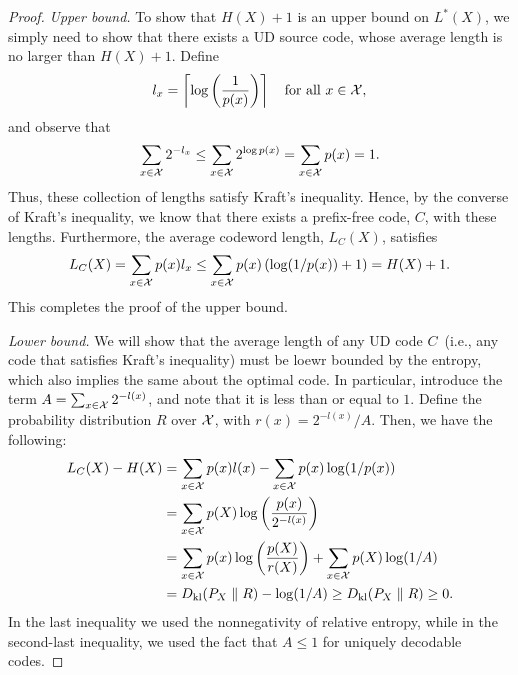     \begin{proof}
        \emph{Upper bound.} To show that $H(X) + 1$ is an upper bound on $L^*(X)$, we simply need to show that there exists a UD source code, whose average length is no larger than $H(X) + 1$. Define 
        \begin{align}
            l_x = \left\lceil \log\left( \frac{1}{p(x)} \right) \right\rceil \quad \text{for all } x \in \mathcal{X}, 
        \end{align}
        and observe that 
        \begin{align}
            \sum_{x \in \mathcal{X}} 2^{-l_x} \leq \sum_{x \in \mathcal{X}} 2^{\log p(x)} = \sum_{x \in \mathcal{X}} p(x) = 1. 
        \end{align}
        Thus, these collection of lengths satisfy Kraft's inequality. Hence, by the converse of Kraft's inequality, we know that there exists a prefix-free code, $C$, with these lengths. Furthermore, the average codeword length, $L_C(X)$, satisfies 
        \begin{align}
            L_C(X) = \sum_{x \in \mathcal{X}} p(x) l_x \leq \sum_{x \in \mathcal{X}} p(x)  \left( \log(1/p(x)) + 1 \right)  = H(X) + 1. 
        \end{align}
        This completes the proof of the upper bound. 
        

        \emph{Lower bound.} We will show that the average length of any UD code $C$~(i.e., any code that satisfies Kraft's inequality) must be loewr bounded by the entropy, which also implies the same about the optimal code. 
        In particular, introduce the term $A = \sum_{x \in \mathcal{X}} 2^{-l(x)}$, and note that it is less than or equal to $1$. Define the probability distribution $R$ over $\mathcal{X}$, with \pmf $r(x) = 2^{-l(x)}/A$. Then, we have the following: 
        \begin{align}
            L_C(X) - H(X) &= \sum_{x \in \mathcal{X}} p(x) l(x) - \sum_{x \in \mathcal{X}} p(x) \log(1/p(x))\\
            & = \sum_{x \in \mathcal{X}} p(X) \log \left( \frac{p(x)}{2^{-l(x)}} \right)  \\
            & = \sum_{x \in \mathcal{X}} p(x) \log \left( \frac{p(X)}{r(X)} \right) + \sum_{x \in \mathcal{X}} p(X) \log(1/A)  \\
            & = D_{\text{kl}}(P_X \parallel R) - \log(1/A) \geq D_{\text{kl}}(P_X \parallel R) \geq 0. 
        \end{align}
        In the last inequality we used the nonnegativity of relative entropy, while in the second-last inequality, we used the fact that $A \leq 1$ for uniquely decodable codes. 
    \end{proof}
